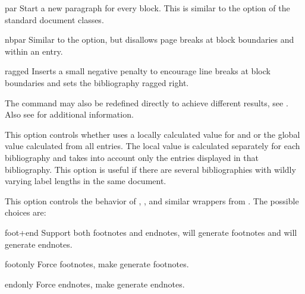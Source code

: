 \documentclass{ltxdockit}[2011/03/25]
\begin{document}
\begin{optionlist}
\begin{valuelist}
\item[par] Start a new paragraph for every block. This is similar to the  option of the standard \latex document classes.

\item[nbpar] Similar to the  option, but disallows page breaks at block boundaries and within an entry.

\item[ragged] Inserts a small negative penalty to encourage line breaks at block boundaries and sets the bibliography ragged right.

\end{valuelist}

The  command may also be redefined directly to achieve different results, see . Also see  for additional information.


This option controls whether  uses a locally calculated value for  and  or the global value calculated from all entries. The local value is calculated separately for each bibliography and takes into account only the entries displayed in that bibliography. This option is useful if there are several bibliographies with wildly varying label lengths in the same document.


This option controls the behavior of , , and similar wrappers from . The possible choices are:

\begin{valuelist}
\item[foot+end] Support both footnotes and endnotes, \ie {} will generate footnotes and  will generate endnotes.
\item[footonly] Force footnotes, \ie make  generate footnotes.
\item[endonly] Force endnotes, \ie make  generate endnotes.
\end{valuelist}



\end{optionlist}
\end{document}
